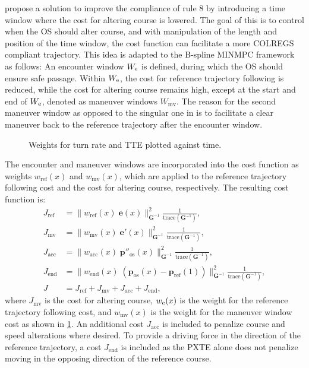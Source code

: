 \cite{Thyri2022-MPC} propose a solution to improve the compliance of rule 8 by introducing a time window where the cost for altering course is lowered. The goal of this is to control when the OS should alter course, and with manipulation of the length and position of the time window, the cost function can facilitate a more COLREGS compliant trajectory. This idea is adapted to the B-spline MINMPC framework as follows:
An encounter window $W_\text e$ is defined, during which the OS should ensure safe passage. Within $W_\text e$, the cost for reference trajectory following is reduced, while the cost for altering course remains high, except at the start and end of $W_\text e$, denoted as maneuver windows $W_\text{mv}$. 
The reason for the second maneuver window as opposed to the singular one in \cite{Thyri2022-MPC} is to facilitate a clear maneuver back to the reference trajectory after the encounter window.

\begin{figure}
    \centering
    
    \caption{Weights for turn rate and TTE plotted against time.}
    \label{fig:maneuver-window}
\end{figure}

The encounter and maneuver windows are incorporated into the cost function as weights $w_\text{ref}(x)$ and $w_\text{mv}(x)$, which are applied to the reference trajectory following cost and the cost for altering course, respectively. The resulting cost function is:
\begin{subequations}\label{eq:cost-maneuver-window}
    \begin{align}
        J_\text{ref} &= \|w_\text{ref}(x)\;\mathbf e(x)\|_{\mathbf G^{-1}}^2 \frac{1}{\text{trace}(\mathbf G^{-1})}, 
        \label{eq:cost-maneuver-window-ref}\\
        J_\text{mv} &= \|w_\text{mv}(x)\;\mathbf e'(x)\|_{\mathbf G^{-1}}^2 \frac{1}{\text{trace}(\mathbf G^{-1})},
        \label{eq:cost-maneuver-window-mv}\\
        J_\mathrm{acc} &= \|w_\text{acc}(x)\;\mathbf p''_\text{os}(x)\|_{\mathbf G^{-1}}^2 \frac{1}{\text{trace}(\mathbf G^{-1})}, \label{eq:cost-maneuver-window-acc}\\
        J_\mathrm{end} &= \|w_\text{end}(x)\;(\mathbf p_\text{os}(x)-\mathbf p_\text{ref}(1))\|_{\mathbf G^{-1}}^2 \frac{1}{\text{trace}(\mathbf G^{-1})}, \label{eq:cost-maneuver-window-end}\\
        J &= J_\text{ref} + J_\text{mv} + J_\mathrm{acc} + J_\mathrm{end},
        \label{eq:cost-maneuver-window-total}
    \end{align}
\end{subequations}
where $J_\text{mv}$ is the cost for altering course, $w_\text e(x)$ is the weight for the reference trajectory following cost, and $w_\text{mv}(x)$ is the weight for the maneuver window cost as shown in \cref{fig:maneuver-window}. An additional cost $J_\mathrm{acc}$ is included to penalize course and speed alterations where desired. To provide a driving force in the direction of the reference trajectory, a cost $J_\mathrm{end}$ is included as the PXTE alone does not penalize moving in the opposing direction of the reference course. 


